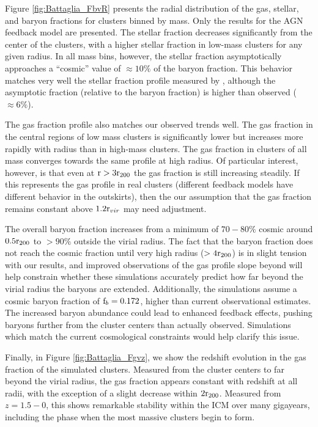 

Figure \ref{fig:Battaglia_FbvR} presents the radial distribution of
the gas, stellar, and baryon fractions for clusters binned by
mass. Only the results for the AGN feedback model are presented. The
stellar fraction decreases significantly from the center of the
clusters, with a higher stellar fraction in low-mass clusters for any
given radius. In all mass bins, however, the stellar fraction
asymptotically approaches a ``cosmic'' value of $\approx10\%$ of the
baryon fraction. This behavior matches very well the stellar fraction
profile measured by \citet{Bahcall2014}, although the asymptotic
fraction (relative to the baryon fraction) is higher than observed
($\approx6\%$).

The gas fraction profile also matches our observed trends well. The
gas fraction in the central regions of low mass clusters is
significantly lower but increases more rapidly with radius than in
high-mass clusters. The gas fraction in clusters of all mass converges
towards the same profile at high radius. Of particular interest,
however, is that even at $\textrm{r}{}>3\textrm{r\ensuremath{_{200}}}{}$ the gas fraction is
still increasing steadily. If this represents the gas profile in real
clusters (different feedback models have different behavior in the
outskirts), then the our assumption that the gas fraction remains
constant above $1.2\textrm{r\ensuremath{_{vir}}}{}$ may need adjustment.

The overall baryon fraction increases from a minimum of $70-80\%$
cosmic around $0.5\textrm{r\ensuremath{_{200}}}{}$ to $>90\%$ outside the virial radius. The
fact that the baryon fraction does not reach the cosmic fraction until
very high radius ($>4\textrm{r\ensuremath{_{200}}}{}$) is in slight tension with our results,
and improved observations of the gas profile slope beyond \rtwo{} will
help constrain whether these simulations accurately predict how far
beyond the virial radius the baryons are extended. Additionally,
the simulations assume a cosmic baryon fraction of $\textrm{f\ensuremath{_b}}{} = 0.172$,
higher than current observational estimates. The increased baryon
abundance could lead to enhanced feedback effects, pushing baryons
further from the cluster centers than actually observed. Simulations
which match the current cosmological constraints would help clarify
this issue. 



Finally, in Figure \ref{fig:Battaglia_Fgvz}, we show the redshift
evolution in the gas fraction of the \citet{Battaglia2013} simulated
clusters. Measured from the cluster centers to far beyond the virial
radius, the gas fraction appears constant with redshift at all radii,
with the exception of a slight decrease within $2\textrm{r\ensuremath{_{200}}}$. Measured from
$z=1.5-0$, this shows remarkable stability within the ICM over many
gigayears, including the phase when the most massive clusters begin to
form.

